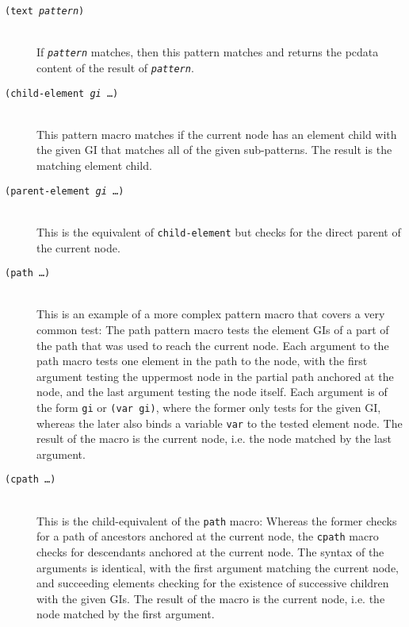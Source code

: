 \documentclass[a4paper,11pt]{scrartcl}
\begin{document}
\begin{description}
\item[\texttt{(text \textsl{pattern})}]\hspace{2cm}\\
  If \texttt{\textsl{pattern}} matches, then this pattern matches and
  returns the pcdata content of the result of
  \texttt{\textsl{pattern}}.
\item[\texttt{(child-element \textsl{gi} \dots)}]\hspace{2cm}\\
  This pattern macro matches if the current node has an element child
  with the given GI that matches all of the given sub-patterns.  The
  result is the matching element child.
\item[\texttt{(parent-element \textsl{gi} \dots)}]\hspace{2cm}\\
  This is the equivalent of \texttt{child-element} but checks for the
  direct parent of the current node.
\item[\texttt{(path \dots)}]\hspace{2cm}\\
  This is an example of a more complex pattern macro that covers a
  very common test:  The path pattern macro tests the element GIs of
  a part of the path that was used to reach the current node.
  Each argument to the path macro tests one element in the path to the
  node, with the first argument testing the uppermost node in the
  partial path anchored at the node, and the last argument testing the
  node itself.  Each argument is of the form \texttt{gi} or 
  \texttt{(var gi)}, where the former only tests for the given GI,
  whereas the later also binds a variable \texttt{var} to the tested
  element node.  The result of the macro is the current node, i.e. the
  node matched by the last argument.
\item[\texttt{(cpath \dots)}]\hspace{2cm}\\
  This is the child-equivalent of the \texttt{path} macro:  Whereas
  the former checks for a path of ancestors anchored at the current
  node, the \texttt{cpath} macro checks for descendants anchored at
  the current node.  The syntax of the arguments is identical, with
  the first argument matching the current node, and succeeding
  elements checking for the existence of successive children with the
  given GIs.  The result of the macro is the current node, i.e. the
  node matched by the first argument.
\end{description}
\end{document}
